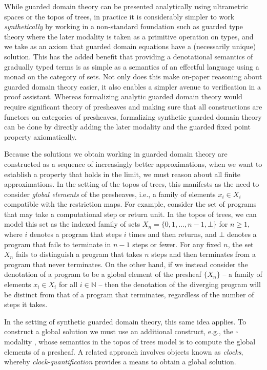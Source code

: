 While guarded domain theory can be presented analytically using
ultrametric spaces or the topos of trees, in practice it is
considerably simpler to work \emph{synthetically} by working in a
non-standard foundation such as guarded type theory where the later
modality is taken as a primitive operation on types, and we take as an
axiom that guarded domain equations have a (necessarily unique)
solution. This has the added benefit that providing a denotational
semantics of gradually typed terms is as simple as a semantics of an
effectful language using a monad on the category of sets. Not only
does this make on-paper reasoning about guarded domain theory easier,
it also enables a simpler avenue to verification in a proof
assistant. Whereas formalizing analytic guarded domain theory would
require significant theory of presheaves and making sure that all
constructions are functors on categories of presheaves, formalizing
synthetic guarded domain theory can be done by directly adding the
later modality and the guarded fixed point property axiomatically.
%

Because the solutions we obtain working in guarded domain theory are constructed
as a sequence of increasingly better approximations, when we want to establish a
property that holds in the limit, we must reason about all finite
approximations. In the setting of the topos of trees, this manifests as the need
to consider \emph{global elements} of the presheaves, i.e., a family of elements
$x_i \in X_i$ compatible with the restriction maps. For example, consider the
set of programs that may take a computational step or return unit. In the topos
of trees, we can model this set as the indexed family of sets $X_n =
\{0,1,\dots,n-1, \bot\}$ for $n \ge 1$, where $i$ denotes a program that steps
$i$ times and then returns, and $\bot$ denotes a program that fails to terminate
in $n-1$ steps or fewer. For any fixed $n$, the set $X_n$ fails to distinguish a
program that takes $n$ steps and then terminates from a program that never
terminates. On the other hand, if we instead consider the denotation of a
program to be a global element of the presheaf $\{X_n\}$ -- a family of
elements $x_i \in X_i$ for all $i \in \mathbb{N}$ -- then the denotation of the
diverging program will be distinct from that of a program that terminates,
regardless of the number of steps it takes.

In the setting of synthetic guarded domain theory, this same idea applies. To
construct a global solution we must use an additional construct, e.g., the
$\square$ modality \cite{10.1007/978-3-319-08918-8_8}, whose semantics in the
topos of trees model is to compute the global elements of a presheaf. A related
approach involves objects known as \emph{clocks}, whereby
\emph{clock-quantification} \cite{atkey-mcbride2013} provides a means to obtain
a global solution.

